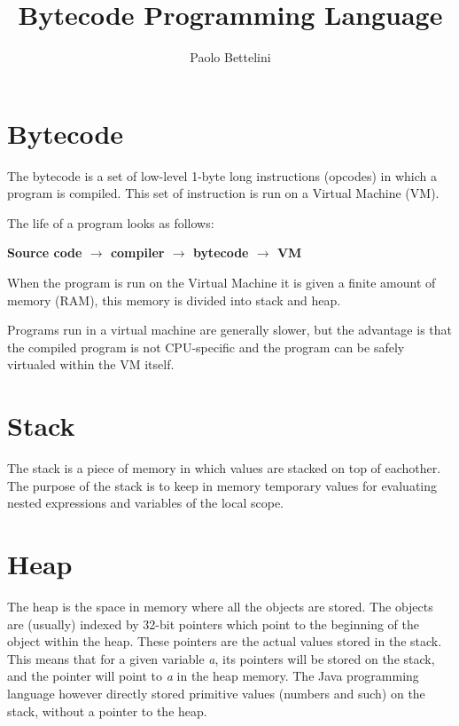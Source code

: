 \documentclass{article}
\title{Bytecode Programming Language}
\author{Paolo Bettelini}
\date{}
\begin{document}
\maketitle
\tableofcontents
\pagebreak

\section{Bytecode}

The bytecode is a set of low-level 1-byte long instructions (opcodes) in which a program is compiled.
This set of instruction is run on a Virtual Machine (VM).

The life of a program looks as follows:

\begin{center}
\textbf{
    Source code \(\rightarrow\) compiler \(\rightarrow\) bytecode \(\rightarrow\) VM
}
\end{center}

When the program is run on the Virtual Machine it is given a finite amount of memory (RAM),
this memory is divided into stack and heap.

Programs run in a virtual machine are generally slower, but the advantage is that the
compiled program is not CPU-specific and the program can be safely virtualed within the VM itself.

\section{Stack}

The stack is a piece of memory in which values are stacked on top of eachother.
The purpose of the stack is to keep in memory temporary values for evaluating nested expressions and
variables of the local scope.

\section{Heap}

The heap is the space in memory where all the objects are stored.
The objects are (usually) indexed by 32-bit pointers which point to the beginning of the object within the heap.
These pointers are the actual values stored in the stack.
This means that for a given variable \textit{a}, its pointers will be stored on the stack, and the pointer will point to \textit{a} in the heap memory.
The Java programming language however directly stored primitive values (numbers and such) on the stack, without a pointer to the heap.
\end{document}
